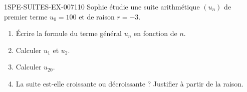 \begin{exercice}{1SPE-SUITES-EX-007}{1}{10}
Sophie étudie une suite arithmétique $(u_n)$ de premier terme $u_0 = 100$ et de raison $r = -3$.
\begin{enumerate}
  \item Écrire la formule du terme général $u_n$ en fonction de $n$.
  \item Calculer $u_1$ et $u_2$.
  \item Calculer $u_{20}$.
  \item La suite est-elle croissante ou décroissante ? Justifier à partir de la raison.
\end{enumerate}
\end{exercice}
